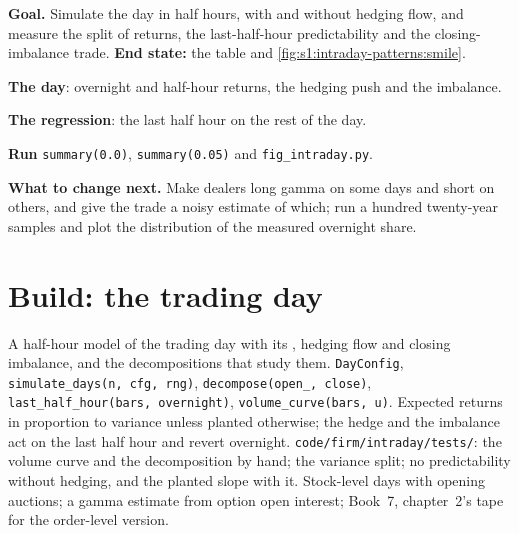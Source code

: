 \begin{tutorial}
\textbf{Goal.} Simulate the day in half hours, with and without hedging flow, and measure the split of returns, the last-half-hour predictability and the
closing-imbalance trade. \textbf{End state:} the table and \cref{fig:s1:intraday-patterns:smile}.
\begin{tutsteps}
\item \textbf{The day}: overnight and half-hour returns, the hedging push and the imbalance.
\label{lst:s1:intraday-patterns:day}
\item \textbf{The regression}: the last half hour on the rest of the day.
\label{lst:s1:intraday-patterns:reg}
\item \textbf{Run} \texttt{summary(0.0)}, \texttt{summary(0.05)} and \texttt{fig\_intraday.py}.
\end{tutsteps}
\textbf{What to change next.} Make dealers long gamma on some days and short on others, and give the trade a noisy estimate of which; run a hundred twenty-year
samples and plot the distribution of the measured overnight share.
\end{tutorial}

\section{Build: the trading day}\label{bld:s1:intraday-patterns:intraday}

\begin{build}
 A half-hour model of the trading day with its , hedging flow and closing imbalance, and the decompositions that study them.
 \texttt{DayConfig}, \texttt{simulate\_days(n, cfg, rng)}, \texttt{decompose(open\_, close)}, \texttt{last\_half\_hour(bars, overnight)},
\texttt{volume\_curve(bars, u)}.
 Expected returns in proportion to variance unless planted otherwise; the hedge and the imbalance act on the last half hour and revert
overnight.
 \texttt{code/firm/intraday/tests/}: the volume curve and the decomposition by hand; the variance split; no predictability without
hedging, and the planted slope with it.
 Stock-level days with opening auctions; a gamma estimate from option open interest; Book~7, chapter~2's tape for the order-level version.
\end{build}


